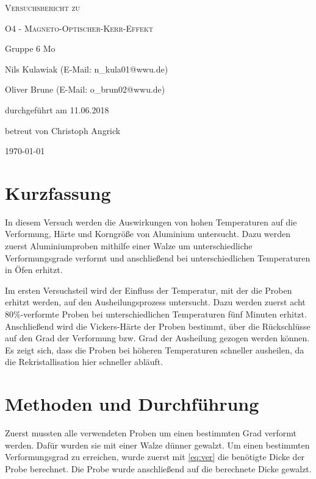 \documentclass[
	a4paper,
	12pt,
	pagesize,
	ngerman
]{scrartcl}
\begin{document}
\begin{titlepage}
	\centering
	{\scshape\LARGE Versuchsbericht zu \par}
	\vspace{1cm}
	{\scshape\huge O4 - Magneto-Optischer-Kerr-Effekt \par}
	\vspace{2.5cm}
	{\LARGE Gruppe 6 Mo\par}
	\vspace{0.5cm}
	{\large Nils Kulawiak (E-Mail: n\_kula01@wwu.de) \par}
	{\large Oliver Brune (E-Mail: o\_brun02@wwu.de) \par}
	\vfill
	durchgeführt am 11.06.2018\par
	
	\vfill
	betreut von Christoph Angrick
	{\large \today\par}
\end{titlepage}

\tableofcontents
		
\newpage
\section{Kurzfassung}
In diesem Versuch werden die Auswirkungen von hohen Temperaturen auf die Verformung, Härte und Korngröße von Aluminium untersucht. Dazu werden zuerst Aluminiumproben mithilfe einer Walze um unterschiedliche Verformungsgrade verformt und anschließend bei unterschiedlichen Temperaturen in Öfen erhitzt.

Im ersten Versuchsteil wird der Einfluss der Temperatur, mit der die Proben erhitzt werden, auf den Ausheilungsprozess untersucht. Dazu werden zuerst acht $80\%$-verformte Proben bei unterschiedlichen Temperaturen fünf Minuten erhitzt. Anschließend wird die Vickers-Härte der Proben bestimmt, über die Rückschlüsse auf den Grad der Verformung bzw. Grad der Ausheilung gezogen werden können. Es zeigt sich, dass die Proben bei höheren Temperaturen schneller ausheilen, da die Rekristallisation hier schneller abläuft.

\section{Methoden und Durchführung}
Zuerst mussten alle verwendeten Proben um einen bestimmten Grad verformt werden. Dafür wurden sie mit einer Walze dünner gewalzt. Um einen bestimmten Verformungsgrad zu erreichen, wurde zuerst mit \cref{eq:ver} die benötigte Dicke der Probe berechnet. Die Probe wurde anschließend auf die berechnete Dicke gewalzt.
\end{document}
